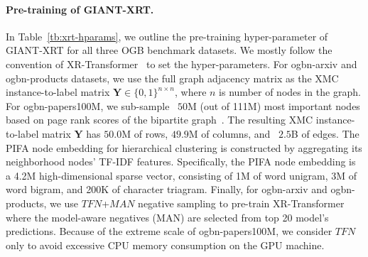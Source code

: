 \documentclass{article} \usepackage{iclr2022_conference,times}
\begin{document}
\paragraph{Pre-training of GIANT-XRT.}
In Table~\ref{tb:xrt-hparams}, we outline the pre-training hyper-parameter of GIANT-XRT for all three OGB benchmark datasets.
We mostly follow the convention of XR-Transformer~\citep{jiong2021fast} to set the hyper-parameters.
For ogbn-arxiv and ogbn-products datasets, we use the full graph adjacency matrix as the XMC instance-to-label matrix $\mathbf{Y} \in \{0,1\}^{n \times n}$, where $n$ is number of nodes in the graph.
For ogbn-papers100M, we sub-sample ~$50$M (out of 111M) most important nodes based on page rank scores of the bipartite graph~\citep{he2016birank}.
The resulting XMC instance-to-label matrix $\mathbf{Y}$ has $50.0$M of rows, $49.9$M of columns, and ~$2.5$B of edges.
The PIFA node embedding for hierarchical clustering is constructed by aggregating its neighborhood nodes' TF-IDF features.
Specifically, the PIFA node embedding is a 4.2M high-dimensional sparse vector, consisting of 1M of word unigram, 3M of word bigram, and 200K of character triagram. 
Finally, for ogbn-arxiv and ogbn-products, we use $TFN$+$MAN$ negative sampling to pre-train XR-Transformer where the model-aware negatives (MAN) are selected from top 20 model's predictions.
Because of the extreme scale of ogbn-papers100M, we consider $TFN$ only to avoid excessive CPU memory consumption on the GPU machine.


\begin{table*}[h]
    \centering
    \caption{Hyper-parameters of GIANT-XRT.
        $HLT$ defines the structures of the hierarchical label trees.
        $lr_{max}$ is the maximum learning rate in pre-training.
        $n_{step}$ is the number of optimization steps for each layer of HLT, respectively.
        $B$ is total number of batch size when using $8$ Nvidia V100 GPUs.
        $NS$ is the negative sampling strategy in XR-Transformer.
        $D$ is the $D$th layer of $HLT$ where we take the Transformer encoder to generate node embeddings as input for downstream GNN models.}
    \label{tb:xrt-hparams}
\end{table*}
\end{document}
